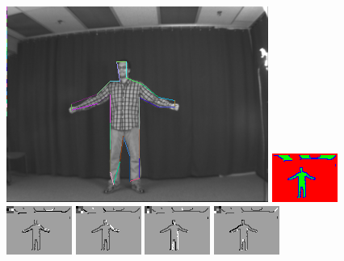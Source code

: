 \begin{figure}
\includegraphics[width=0.48 \linewidth]{output/2.detection/local_inference/out.s1.0020.d/thefinalparse.png}
\includegraphics[width=0.48 \linewidth]{output/2.detection/local_inference/out.s1.0020.d/local.x5.interior.png}
\includegraphics[width=0.24 \linewidth]{output/2.detection/local_inference/out.s1.0020.d/local.x5.orientations.0.png}
\includegraphics[width=0.24 \linewidth]{output/2.detection/local_inference/out.s1.0020.d/local.x5.orientations.1.png}
\includegraphics[width=0.24 \linewidth]{output/2.detection/local_inference/out.s1.0020.d/local.x5.orientations.2.png}
\includegraphics[width=0.24 \linewidth]{output/2.detection/local_inference/out.s1.0020.d/local.x5.orientations.3.png}

\end{figure}
